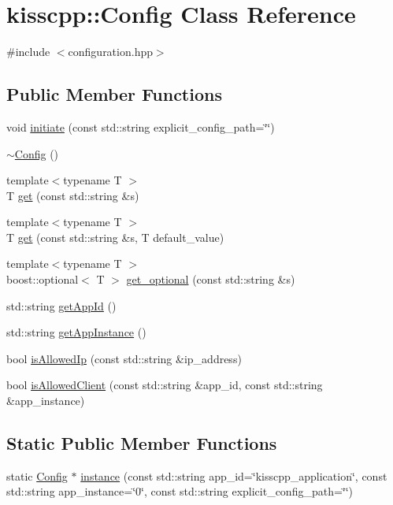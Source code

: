 \hypertarget{classkisscpp_1_1_config}{\section{kisscpp\-:\-:Config Class Reference}
\label{classkisscpp_1_1_config}
}


{\ttfamily \#include $<$configuration.\-hpp$>$}

\subsection*{Public Member Functions}
\begin{DoxyCompactItemize}
\item 
void \hyperlink{classkisscpp_1_1_config_a3d46f787270d6aeac04635c04936c404}{initiate} (const std\-::string explicit\-\_\-config\-\_\-path=\char`\"{}\char`\"{})
\item 
\hyperlink{classkisscpp_1_1_config_ae6fd9d0a11285f8dd5658bf07f728e01}{$\sim$\-Config} ()
\item 
{\footnotesize template$<$typename T $>$ }\\T \hyperlink{classkisscpp_1_1_config_ae237509831f23cd9cbfc67dcd6ed8c9d}{get} (const std\-::string \&s)
\item 
{\footnotesize template$<$typename T $>$ }\\T \hyperlink{classkisscpp_1_1_config_a747baa092e702cb9a42f9c4c74958ddd}{get} (const std\-::string \&s, T default\-\_\-value)
\item 
{\footnotesize template$<$typename T $>$ }\\boost\-::optional$<$ T $>$ \hyperlink{classkisscpp_1_1_config_a0b0267e59a04df930282c0b39e7f79dd}{get\-\_\-optional} (const std\-::string \&s)
\item 
std\-::string \hyperlink{classkisscpp_1_1_config_a5f970e234e909ccb7b18bf4e7705e336}{get\-App\-Id} ()
\item 
std\-::string \hyperlink{classkisscpp_1_1_config_a9a68e47e345ee1fa208397f1c19859f2}{get\-App\-Instance} ()
\item 
bool \hyperlink{classkisscpp_1_1_config_a9b6825f6980d6caa4780567936ce77a6}{is\-Allowed\-Ip} (const std\-::string \&ip\-\_\-address)
\item 
bool \hyperlink{classkisscpp_1_1_config_afb8591ec6e7e7cd86e151f45c7c8ba3b}{is\-Allowed\-Client} (const std\-::string \&app\-\_\-id, const std\-::string \&app\-\_\-instance)
\end{DoxyCompactItemize}
\subsection*{Static Public Member Functions}
\begin{DoxyCompactItemize}
\item 
static \hyperlink{classkisscpp_1_1_config}{Config} $\ast$ \hyperlink{classkisscpp_1_1_config_a235cf3d03c1211faa29efa63556921fc}{instance} (const std\-::string app\-\_\-id=\char`\"{}kisscpp\-\_\-application\char`\"{}, const std\-::string app\-\_\-instance=\char`\"{}0\char`\"{}, const std\-::string explicit\-\_\-config\-\_\-path=\char`\"{}\char`\"{})
\end{DoxyCompactItemize}


